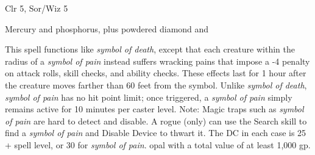 
\begin{description*}
\item[Level:] Clr 5, Sor/Wiz 5
\item[Arcane Material Component:] Mercury and phosphorus, plus powdered diamond and
\end{description*}

This spell functions like \textit{symbol of death}, except that each creature within
the radius of a \textit{symbol of pain} instead suffers wracking pains that impose
a -4 penalty on attack rolls, skill checks, and ability checks. These effects last
for 1 hour after the creature moves farther than 60 feet from the symbol.
Unlike \textit{symbol of death}, \textit{symbol of pain} has no hit point limit;
once triggered, a \textit{symbol of pain} simply remains active for 10 minutes
per caster level.
Note: Magic traps such as \textit{symbol of pain} are hard to detect and
disable. A rogue (only) can use the Search skill to find a \textit{symbol of pain
}and Disable Device to thwart it. The DC in each case is 25 + spell level, or 30
for \textit{symbol of pain}.
opal with a total value of at least 1,000 gp.